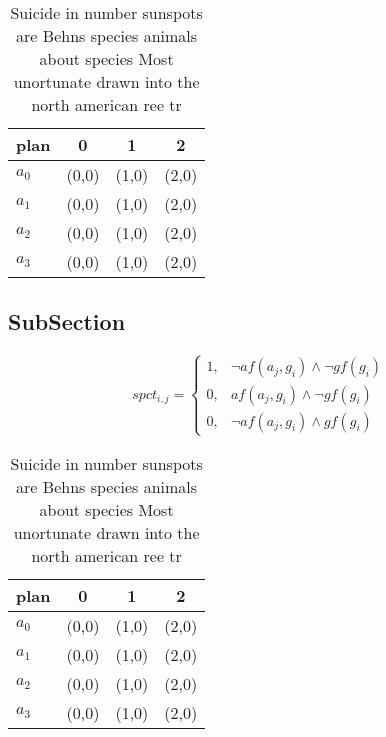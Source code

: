 \documentclass[a4paper]{article}
\begin{document}
\begin{table}
\begin{adjustbox}{width=0.6\columnwidth}
\begin{tabular}{|l|l|l|l|}
\hline
\textbf{plan} & \multicolumn{1}{c|}{\textbf{0}} & \multicolumn{1}{c|}{\textbf{1}} & \multicolumn{1}{c|}{\textbf{2}} \\ \hline
\textbf{$a_0$}  & (0,0) & (1,0) & (2,0) \\ \hline
\textbf{$a_1$}  & (0,0) & (1,0) & (2,0) \\ \hline
\textbf{$a_2$}  & (0,0) & (1,0) & (2,0) \\ \hline
\textbf{$a_3$}  & (0,0) & (1,0) & (2,0) \\ \hline
\end{tabular}
\end{adjustbox}
\caption{Suicide in number sunspots are Behns species animals about species Most unortunate drawn into the north american ree tr
}
\end{table}

\subsection{SubSection}

\begin{equation}
spct_{i,j} =
\begin{cases}
1, & \text{$\neg af(a_j,g_i) \wedge \neg gf(g_i)$}\\
0, & \text{$af(a_j,g_i) \wedge \neg gf(g_i)$}\\
0, & \text{$\neg af(a_j,g_i) \wedge gf(g_i)$}
\end{cases}
\end{equation}

\begin{table}
\begin{adjustbox}{width=0.6\columnwidth}
\begin{tabular}{|l|l|l|l|}
\hline
\textbf{plan} & \multicolumn{1}{c|}{\textbf{0}} & \multicolumn{1}{c|}{\textbf{1}} & \multicolumn{1}{c|}{\textbf{2}} \\ \hline
\textbf{$a_0$}  & (0,0) & (1,0) & (2,0) \\ \hline
\textbf{$a_1$}  & (0,0) & (1,0) & (2,0) \\ \hline
\textbf{$a_2$}  & (0,0) & (1,0) & (2,0) \\ \hline
\textbf{$a_3$}  & (0,0) & (1,0) & (2,0) \\ \hline
\end{tabular}
\end{adjustbox}
\caption{Suicide in number sunspots are Behns species animals about species Most unortunate drawn into the north american ree tr
}
\end{table}
\end{document}
